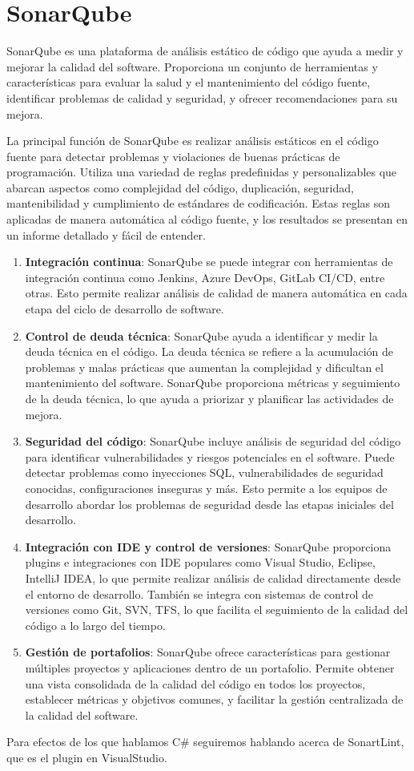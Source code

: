 \documentclass[executivepaper]{article}
\begin{document}
\section{SonarQube}
SonarQube es una plataforma de análisis estático de código que ayuda a medir y mejorar la calidad del software. Proporciona un conjunto de herramientas y características para evaluar la salud y el mantenimiento del código fuente, identificar problemas de calidad y seguridad, y ofrecer recomendaciones para su mejora.

La principal función de SonarQube es realizar análisis estáticos en el código fuente para detectar problemas y violaciones de buenas prácticas de programación. Utiliza una variedad de reglas predefinidas y personalizables que abarcan aspectos como complejidad del código, duplicación, seguridad, mantenibilidad y cumplimiento de estándares de codificación. Estas reglas son aplicadas de manera automática al código fuente, y los resultados se presentan en un informe detallado y fácil de entender.

\begin{enumerate}
    \item \textbf{Integración continua}: SonarQube se puede integrar con herramientas de integración continua como Jenkins, Azure DevOps, GitLab CI/CD, entre otras. Esto permite realizar análisis de calidad de manera automática en cada etapa del ciclo de desarrollo de software.
    \item \textbf{Control de deuda técnica}: SonarQube ayuda a identificar y medir la deuda técnica en el código. La deuda técnica se refiere a la acumulación de problemas y malas prácticas que aumentan la complejidad y dificultan el mantenimiento del software. SonarQube proporciona métricas y seguimiento de la deuda técnica, lo que ayuda a priorizar y planificar las actividades de mejora.
    \item \textbf{Seguridad del código}: SonarQube incluye análisis de seguridad del código para identificar vulnerabilidades y riesgos potenciales en el software. Puede detectar problemas como inyecciones SQL, vulnerabilidades de seguridad conocidas, configuraciones inseguras y más. Esto permite a los equipos de desarrollo abordar los problemas de seguridad desde las etapas iniciales del desarrollo.
    \item \textbf{Integración con IDE y control de versiones}: SonarQube proporciona plugins e integraciones con IDE populares como Visual Studio, Eclipse, IntelliJ IDEA, lo que permite realizar análisis de calidad directamente desde el entorno de desarrollo. También se integra con sistemas de control de versiones como Git, SVN, TFS, lo que facilita el seguimiento de la calidad del código a lo largo del tiempo.
    \item \textbf{Gestión de portafolios}: SonarQube ofrece características para gestionar múltiples proyectos y aplicaciones dentro de un portafolio. Permite obtener una vista consolidada de la calidad del código en todos los proyectos, establecer métricas y objetivos comunes, y facilitar la gestión centralizada de la calidad del software.
\end{enumerate}

Para efectos de los que hablamos C\# seguiremos hablando acerca de SonartLint, que es el plugin en VisualStudio.

\subsection*{}
\end{document}
